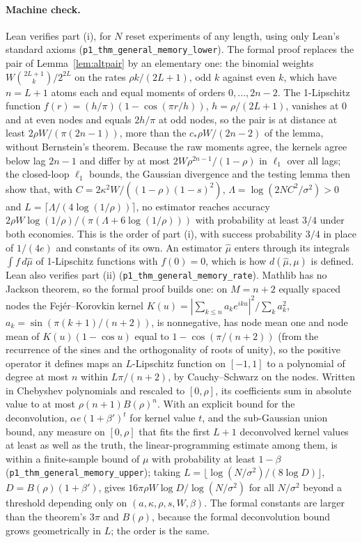 \documentclass[12pt]{article}
\theoremstyle{definition}
\theoremstyle{remark}
\begin{document}
\paragraph{Machine check.} Lean verifies part (i), for $N$ reset experiments of any length, using only Lean's standard axioms (\texttt{p1\_thm\_general\_memory\_lower}). The formal proof replaces the pair of Lemma~\ref{lem:altpair} by an elementary one: the binomial weights $W\binom{2L+1}{k}/2^{2L}$ on the rates $\rho k/(2L+1)$, odd $k$ against even $k$, which have $n=L+1$ atoms each and equal moments of orders $0,\ldots,2n-2$. The 1-Lipschitz function $f(r)=(h/\pi)(1-\cos(\pi r/h))$, $h=\rho/(2L+1)$, vanishes at $0$ and at even nodes and equals $2h/\pi$ at odd nodes, so the pair is at distance at least $2\rho W/(\pi(2n-1))$, more than the $c_*\rho W/(2n-2)$ of the lemma, without Bernstein's theorem. Because the raw moments agree, the kernels agree below lag $2n-1$ and differ by at most $2W\rho^{2n-1}/(1-\rho)$ in $\ell_1$ over all lags; the closed-loop $\ell_1$ bounds, the Gaussian divergence and the testing lemma then show that, with $C=2\kappa^2W/((1-\rho)(1-s)^2)$, $\Lambda=\log(2NC^2/\sigma^2)>0$ and $L=\lceil\Lambda/(4\log(1/\rho))\rceil$, no estimator reaches accuracy $2\rho W\log(1/\rho)/(\pi(\Lambda+6\log(1/\rho)))$ with probability at least $3/4$ under both economies. This is the order of part (i), with success probability $3/4$ in place of $1/(4e)$ and constants of its own. An estimator $\hat\mu$ enters through its integrals $\int f\,d\hat\mu$ of 1-Lipschitz functions with $f(0)=0$, which is how $d(\hat\mu,\mu)$ is defined. Lean also verifies part (ii) (\texttt{p1\_thm\_general\_memory\_rate}). Mathlib has no Jackson theorem, so the formal proof builds one: on $M=n+2$ equally spaced nodes the Fejér--Korovkin kernel $K(u)=|\sum_{k\le n}a_ke^{iku}|^2/\sum_ka_k^2$, $a_k=\sin(\pi(k+1)/(n+2))$, is nonnegative, has node mean one and node mean of $K(u)(1-\cos u)$ equal to $1-\cos(\pi/(n+2))$ (from the recurrence of the sines and the orthogonality of roots of unity), so the positive operator it defines maps an $L$-Lipschitz function on $[-1,1]$ to a polynomial of degree at most $n$ within $L\pi/(n+2)$, by Cauchy--Schwarz on the nodes. Written in Chebyshev polynomials and rescaled to $[0,\rho]$, its coefficients sum in absolute value to at most $\rho(n+1)B(\rho)^n$. With an explicit bound for the deconvolution, $\alpha e(1+\beta')^t$ for kernel value $t$, and the sub-Gaussian union bound, any measure on $[0,\rho]$ that fits the first $L+1$ deconvolved kernel values at least as well as the truth, the linear-programming estimate among them, is within a finite-sample bound of $\mu$ with probability at least $1-\beta$ (\texttt{p1\_thm\_general\_memory\_upper}); taking $L=\lfloor\log(N/\sigma^2)/(8\log D)\rfloor$, $D=B(\rho)(1+\beta')$, gives $16\pi\rho W\log D/\log(N/\sigma^2)$ for all $N/\sigma^2$ beyond a threshold depending only on $(a,\kappa,\rho,s,W,\beta)$. The formal constants are larger than the theorem's $3\pi$ and $B(\rho)$, because the formal deconvolution bound grows geometrically in $L$; the order is the same.
\end{document}
